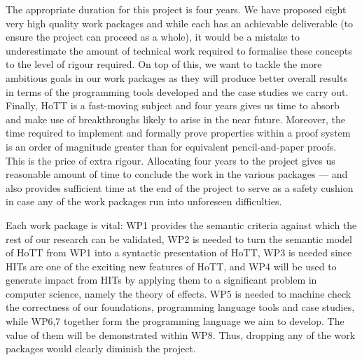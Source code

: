 \documentclass[a4paper,11pt]{article}
\begin{document}
 The appropriate duration for
this project is four years. We have proposed eight very high quality work
packages and while each has an achievable deliverable
(to ensure the project can proceed as a whole), it would be a mistake
to underestimate the amount of technical work required to formalise
these concepts to the level of rigour required. On top of this, we
want to tackle the more ambitious goals in our work packages as they
will produce better overall results in terms of the programming tools
developed and the case studies we carry out. Finally, HoTT is a
fast-moving subject and four years gives us time to absorb and make use
of breakthroughs likely to arise in the near future.  Moreover, the
time required to implement and formally prove properties within a
proof system is an order of magnitude greater than for equivalent
pencil-and-paper proofs. This is the price of extra rigour. Allocating
four years to the project gives us reasonable amount of time to conclude
the work in the various packages --- and also provides sufficient time
at the end of the project to serve as a safety cushion in case any of
the work packages run into unforeseen difficulties.


\noindent Each work package is vital: WP1 provides
the semantic criteria against which the rest of our
research can be validated, WP2 is needed to turn the semantic model of
HoTT from WP1 into a syntactic presentation of HoTT, WP3 is needed
since HITs are one of the exciting new features of HoTT, and WP4 will
be used to generate impact from HITs by applying them to a significant
problem in computer science, namely the theory of effects. WP5 is
needed to machine check the correctness of our foundations,
programming language tools and case studies, while WP6,7
together form the programming language we aim to develop. The
value of them will be demonstrated within WP8.
Thus, dropping any of the work packages would clearly diminish the
project.

\vspace{0.02in}
\end{document}
